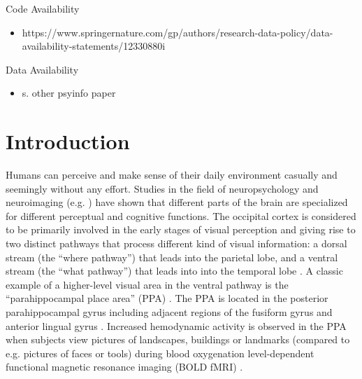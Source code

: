 \documentclass[english]{article}
\begin{document}
\noindent Code Availability
\begin{itemize}
    \item https://www.springernature.com/gp/authors/research-data-policy/data-availability-statements/12330880i
\end{itemize}


\noindent Data Availability
\begin{itemize}
    \item s. other psyinfo paper
\end{itemize}

\pagebreak[4]


\section{Introduction}


Humans can perceive and make sense of their daily environment casually and
seemingly without any effort.
%
Studies in the field of neuropsychology and neuroimaging (e.g.
\citep{penfield1950cerebral, fox1984noninvasive}) have shown that different
parts of the brain are specialized for different perceptual and cognitive
functions.
The occipital cortex is considered to be primarily involved in the early stages
of visual perception and giving rise to two distinct pathways that process
different kind of visual information:
a dorsal stream (the ``where pathway'') that leads into the parietal lobe, and a
ventral stream (the ``what pathway'') that leads into into the temporal lobe
\citep{goodale1992separate, mishkin1982contribution}.
A classic example of a higher-level visual area in the ventral pathway is the
``parahippocampal place area'' (PPA) \citep{epstein1998ppa,
epstein1999parahippocampal}.
The PPA is located in the posterior parahippocampal gyrus including adjacent
regions of the fusiform gyrus and anterior lingual gyrus
\citep{epstein2008parahippocampal}.
Increased hemodynamic activity is observed in the PPA when subjects view
pictures of landscapes, buildings or landmarks (compared to e.g. pictures of
faces or tools) during blood oxygenation level-dependent functional magnetic
resonance imaging (BOLD fMRI) \citep{aguirre1998area, epstein2014neural,
epstein1998ppa, troiani2012object}.
\end{document}
